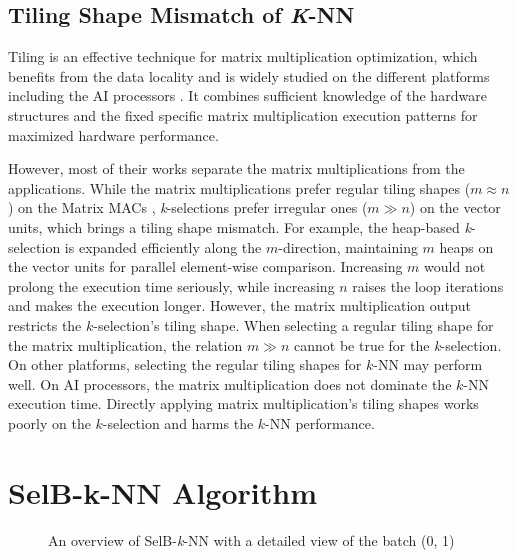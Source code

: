 \subsection{Tiling Shape Mismatch of \textit{K}-NN \label{sec:tiling}}

Tiling is an effective technique for matrix multiplication optimization, which benefits from the data locality and is widely studied on the different platforms including the AI processors \cite{DBLP:conf/ppopp/Li0YJL19, DBLP:conf/ppopp/NiuLJS0022, DBLP:conf/ppopp/HongSNSS19, DBLP:conf/ipps/00020C20, DBLP:conf/ppopp/FengWCZ0D21, DBLP:conf/micro/ZhaoD20}. It combines sufficient knowledge of the hardware structures and the fixed specific matrix multiplication execution patterns for maximized hardware performance.

However, most of their works separate the matrix multiplications from the applications. While the matrix multiplications prefer regular tiling shapes ($m \approx n$) on the Matrix MACs \cite{DBLP:conf/ipps/00020C20}, \textit{k}-selections prefer irregular ones ($m \gg n$) on the vector units, which brings a tiling shape mismatch. For example, the heap-based \textit{k}-selection is expanded efficiently along the $m$-direction, maintaining $m$ heaps on the vector units for parallel element-wise comparison. Increasing $m$ would not prolong the execution time seriously, while increasing $n$ raises the loop iterations and makes the execution longer. However, the matrix multiplication output restricts the $k$-selection's tiling shape. When selecting a regular tiling shape for the matrix multiplication, the relation $m \gg n$ cannot be true for the \textit{k}-selection. On other platforms, selecting the regular tiling shapes for $k$-NN may perform well. On AI processors, the matrix multiplication does not dominate the $k$-NN execution time. Directly applying matrix multiplication's tiling shapes works poorly on the $k$-selection and harms the $k$-NN performance.


\section{SelB-k-NN Algorithm}

\begin{figure}[t]
    \caption{An overview of SelB-\textit{k}-NN with a detailed view of the batch (0, 1)}
    \label{fig:tiling}
    \end{figure}

